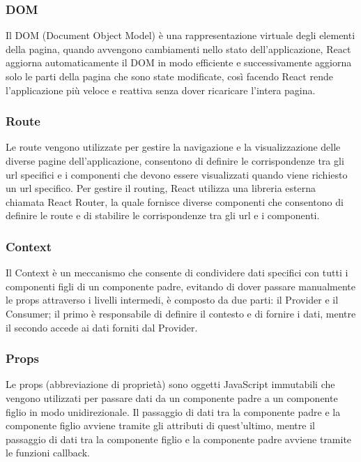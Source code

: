 \subsubsection{DOM}
Il DOM (Document Object Model) è una rappresentazione virtuale degli elementi della pagina, quando avvengono cambiamenti nello stato dell'applicazione, React aggiorna automaticamente il DOM in modo efficiente e successivamente aggiorna solo le parti della pagina che sono state modificate, così facendo React rende l'applicazione più veloce e reattiva senza dover ricaricare l'intera pagina.\\
\subsubsection{Route}
Le route vengono utilizzate per gestire la navigazione e la visualizzazione delle diverse pagine dell'applicazione, consentono di definire le corrispondenze tra gli url specifici e i componenti che devono essere visualizzati quando viene richiesto un url specifico.
Per gestire il routing, React utilizza una libreria esterna chiamata React Router, la quale fornisce diverse componenti che consentono di definire le route e di stabilire le corrispondenze tra gli url e i componenti.\\
\subsubsection{Context}
Il Context è un meccanismo che consente di condividere dati specifici con tutti i componenti figli di un componente padre, evitando di dover passare manualmente le props attraverso i livelli intermedi, è composto da due parti: il Provider e il Consumer; il primo è responsabile di definire il contesto e di fornire i dati, mentre il secondo accede ai dati forniti dal Provider.\\
\subsubsection{Props}
Le props (abbreviazione di proprietà) sono oggetti JavaScript immutabili che vengono utilizzati per passare dati da un componente padre a un componente figlio in modo unidirezionale.
Il passaggio di dati tra la componente padre e la componente figlio avviene tramite gli attributi di quest'ultimo, mentre il passaggio di dati tra la componente figlio e la componente padre avviene tramite le funzioni callback.\\

